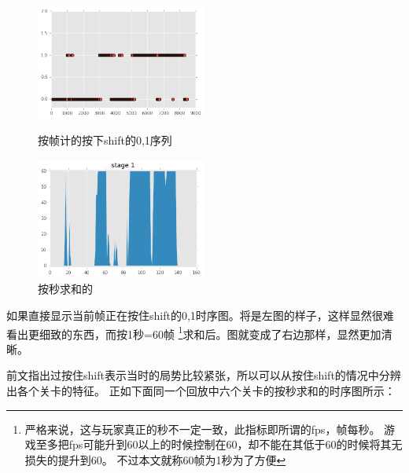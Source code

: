 \documentclass[UTF8]{ctexart}
\begin{document}
\begin{figure}[H]
\begin{minipage}[t]{0.5\linewidth}
\centering
\includegraphics[width=2.2in]{images/pressingShiftFrame.png}
\caption{按帧计的按下shift的0,1序列}
\end{minipage}%
\begin{minipage}[t]{0.5\linewidth}
\centering
\includegraphics[width=2.2in]{images/pressingShift1.png}
\caption{按秒求和的}
\end{minipage}
\end{figure}

如果直接显示当前帧正在按住shift的0,1时序图。将是左图的样子，这样显然很难看出更细致的东西，而按1秒=60帧
\footnote{严格来说，这与玩家真正的秒不一定一致，此指标即所谓的fps，帧每秒。
游戏至多把fps可能升到60以上的时候控制在60，却不能在其低于60的时候将其无损失的提升到60。
不过本文就称60帧为1秒为了方便 }求和后。图就变成了右边那样，显然更加清晰。

前文指出过按住shift表示当时的局势比较紧张，所以可以从按住shift的情况中分辨出各个关卡的特征。
正如下面同一个回放中六个关卡的按秒求和的时序图所示：
\end{document}
